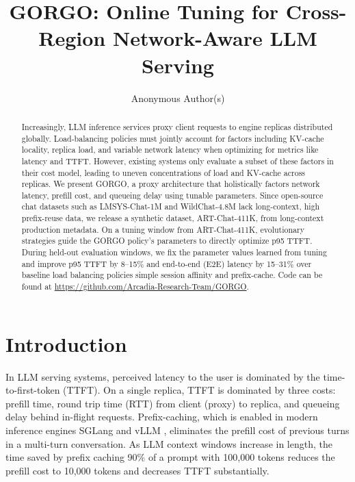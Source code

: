 \documentclass{article}
\title{GORGO: Online Tuning for Cross-Region Network-Aware LLM Serving}
\author{Anonymous Author(s)}
\begin{document}
\maketitle

\begin{abstract}
Increasingly, LLM inference services proxy client requests to engine replicas distributed globally.
Load-balancing policies must jointly account for
factors including KV-cache locality, replica load, and variable network latency when
optimizing for metrics like latency and TTFT.
However, existing systems only evaluate a subset of these factors in their cost
model, leading to uneven concentrations of load and KV-cache across replicas. We
present GORGO, a proxy architecture that holistically factors network latency,
prefill cost, and queueing delay using tunable parameters. Since open-source chat
datasets such as LMSYS-Chat-1M and WildChat-4.8M lack long-context, high
prefix-reuse data, we release a synthetic dataset, ART-Chat-411K, from
long-context production metadata. On a tuning window from ART-Chat-411K,
evolutionary strategies guide the GORGO policy's parameters to directly optimize
p95 TTFT. During held-out evaluation windows, we fix the parameter values learned
from tuning and improve p95 TTFT by 8--15\% and end-to-end (E2E) latency by
15--31\% over baseline load balancing policies simple session affinity and prefix-cache.
Code can be found at \href{https://github.com/Arcadia-Research-Team/GORGO}{https://github.com/Arcadia-Research-Team/GORGO}.
\end{abstract}

\section{Introduction}
\label{sec:intro}

In LLM serving systems, perceived latency to the user is dominated by the time-to-first-token (TTFT). On a single replica, TTFT is dominated by three costs: prefill time, round trip time (RTT) from client (proxy) to replica, and queueing delay behind in-flight requests. Prefix-caching, which is enabled in modern inference engines SGLang \citep{sglang2024} and vLLM \citep{vllm2023}, eliminates the prefill cost of previous turns in a multi-turn conversation. As LLM context windows increase in length, the time saved by prefix caching 90\% of a prompt with 100,000 tokens reduces the prefill cost to 10,000 tokens and decreases TTFT substantially.
\end{document}
